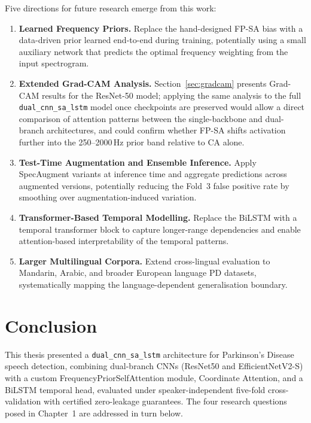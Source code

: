 \documentclass[oneside,openany]{final_report}
\newcommand{\dualcnn}{\texttt{dual\_cnn\_sa\_lstm}}
\begin{document}
Five directions for future research emerge from this work:

\begin{enumerate}
    \item \textbf{Learned Frequency Priors.} Replace the hand-designed FP-SA bias with a data-driven prior learned end-to-end during training, potentially using a small auxiliary network that predicts the optimal frequency weighting from the input spectrogram.

    \item \textbf{Extended Grad-CAM Analysis.} Section~\ref{sec:gradcam} presents Grad-CAM results for the ResNet-50 model; applying the same analysis to the full \dualcnn{} model once checkpoints are preserved would allow a direct comparison of attention patterns between the single-backbone and dual-branch architectures, and could confirm whether FP-SA shifts activation further into the 250--2000\,Hz prior band relative to CA alone.

    \item \textbf{Test-Time Augmentation and Ensemble Inference.} Apply SpecAugment variants at inference time and aggregate predictions across augmented versions, potentially reducing the Fold~3 false positive rate by smoothing over augmentation-induced variation.

    \item \textbf{Transformer-Based Temporal Modelling.} Replace the BiLSTM with a temporal transformer block to capture longer-range dependencies and enable attention-based interpretability of the temporal patterns.

    \item \textbf{Larger Multilingual Corpora.} Extend cross-lingual evaluation to Mandarin, Arabic, and broader European language PD datasets, systematically mapping the language-dependent generalisation boundary.
\end{enumerate}

\chapter{Conclusion}

This thesis presented a \dualcnn{} architecture for Parkinson's Disease speech detection, combining dual-branch CNNs (ResNet50 and EfficientNetV2-S) with a custom FrequencyPriorSelfAttention module, Coordinate Attention, and a BiLSTM temporal head, evaluated under speaker-independent five-fold cross-validation with certified zero-leakage guarantees. The four research questions posed in Chapter~1 are addressed in turn below.
\end{document}
